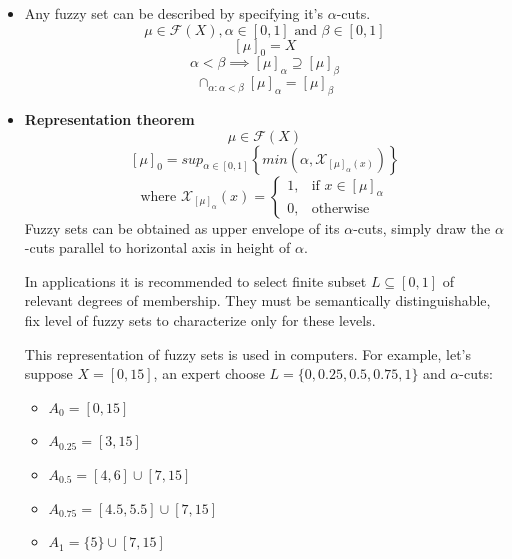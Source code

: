 \documentclass{article}
\begin{document}
\begin{itemize}
    \item Any fuzzy set can be described by specifying it's $\alpha$-cuts.
          $$\mu\in\mathcal{F}(X), \alpha\in[0,1] \text{ and }\beta\in[0,1]$$
          $$[\mu]_0=X$$
          $$\alpha < \beta\implies [\mu]_\alpha \supseteq[\mu]_\beta$$
          $$\cap_{\alpha:\alpha < \beta} [\mu]_\alpha = [\mu]_\beta$$
    \item \textbf{Representation theorem}
          $$\mu\in\mathcal{F}(X)$$
          $$[\mu]_0=sup_{\alpha\in[0,1]} \left\{ min\left(\alpha,\mathcal{X}_{[\mu]_\alpha (x)}\right)\right\}$$
          \[
              \text{where } \mathcal{X}_{[\mu]_\alpha}(x)=
              \begin{cases}
                  1, & \text{if }x\in [\mu]_\alpha \\
                  0, & \text{otherwise}
              \end{cases}
          \]
          Fuzzy sets can be obtained as upper envelope of its $\alpha$-cuts, simply draw the
          $\alpha$-cuts parallel to horizontal axis in height of $\alpha$.

          In applications it is recommended to select finite subset $L\subseteq [0,1]$ of relevant degrees of
          membership. They must be semantically distinguishable, fix level of fuzzy sets to characterize only
          for these levels.

          This representation of fuzzy sets is used in computers. For example, let's suppose $X=[0,15]$,
          an expert choose $L=\{0,0.25,0.5,0.75,1\}$ and  $\alpha$-cuts:
          \begin{itemize}
              \item $A_0 =[0,15]$
              \item $A_{0.25} =[3,15]$
              \item $A_{0.5} =[4,6]\cup [7,15]$
              \item $A_{0.75} =[4.5,5.5]\cup [7,15]$
              \item $A_1 =\{5\}\cup [7,15]$
          \end{itemize}
\end{itemize}
\end{document}
